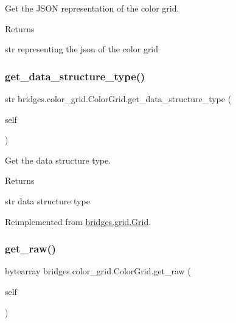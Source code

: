Get the J\+S\+ON representation of the color grid. 

\begin{DoxyReturn}{Returns}


str representing the json of the color grid 
\end{DoxyReturn}
\mbox{\label{classbridges_1_1color__grid_1_1_color_grid_a5340b1aed60318e37cab93eed6093070}} 
\subsubsection{\texorpdfstring{get\_data\_structure\_type()}{get\_data\_structure\_type()}}
{\footnotesize\ttfamily  str bridges.\+color\+\_\+grid.\+Color\+Grid.\+get\+\_\+data\+\_\+structure\+\_\+type (\begin{DoxyParamCaption}\item[{}]{self }\end{DoxyParamCaption})}



Get the data structure type. 

\begin{DoxyReturn}{Returns}


str data structure type 
\end{DoxyReturn}


Reimplemented from \mbox{\hyperlink{classbridges_1_1grid_1_1_grid_af7a6658d4512112c2888afc6cd946461}{bridges.\+grid.\+Grid}}.

\mbox{\label{classbridges_1_1color__grid_1_1_color_grid_aae710dfd1c06f37a98437a6b4fb813bf}} 
\subsubsection{\texorpdfstring{get\_raw()}{get\_raw()}}
{\footnotesize\ttfamily  bytearray bridges.\+color\+\_\+grid.\+Color\+Grid.\+get\+\_\+raw (\begin{DoxyParamCaption}\item[{}]{self }\end{DoxyParamCaption})}



